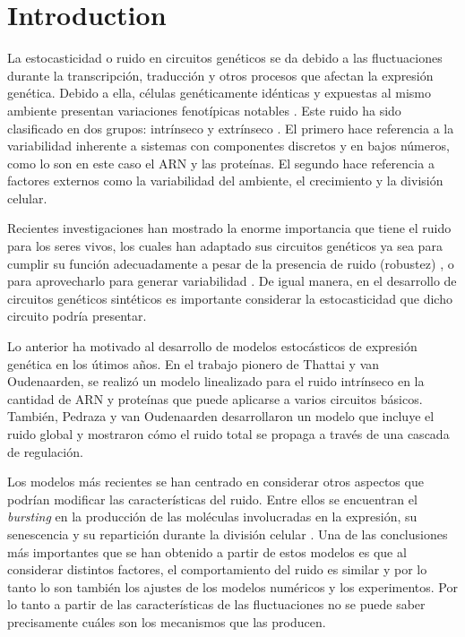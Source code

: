 \chapter*{Introduction}

La estocasticidad o ruido en circuitos gen\'eticos se da debido a las fluctuaciones durante la transcripci\'on, traducci\'on \cite{kaern05} y otros procesos que afectan la expresi\'on gen\'etica. Debido a ella, c\'elulas gen\'eticamente id\'enticas y expuestas al mismo ambiente presentan variaciones fenot\'ipicas notables \cite{kaern05} \cite{elowitz02} \cite{pedraza05}. Este ruido ha sido clasificado en dos grupos: intr\'inseco y extr\'inseco \cite{elowitz02} \cite{paulsson05}. El primero hace referencia a la variabilidad inherente a sistemas con componentes discretos y en bajos n\'umeros, como lo son en este caso el ARN y las prote\'inas. El segundo hace referencia a factores externos como la variabilidad del ambiente, el crecimiento y la divisi\'on celular.

Recientes investigaciones han mostrado la enorme importancia que tiene el ruido para los seres vivos, los cuales han adaptado sus circuitos gen\'eticos ya sea para cumplir su funci\'on adecuadamente a pesar de la presencia de ruido (robustez) \cite{alon99}, o para aprovecharlo para generar variabilidad \cite{arkin98}. De igual manera, en el desarrollo de circuitos gen\'eticos sint\'eticos es importante considerar la estocasticidad que dicho circuito podr\'ia presentar.

Lo anterior ha motivado al desarrollo de modelos estoc\'asticos de expresi\'on gen\'etica en los \'utimos a\~nos. En el trabajo pionero de Thattai y van Oudenaarden,  \cite{thattai01} se realiz\'o un modelo linealizado para el ruido intr\'inseco en la cantidad de ARN y prote\'inas que puede aplicarse a varios circuitos b\'asicos. Tambi\'en, Pedraza y van Oudenaarden \cite{pedraza05} desarrollaron un  modelo que incluye el ruido global y mostraron c\'omo el ruido total se propaga a trav\'es de una cascada de regulaci\'on.

Los modelos m\'as recientes se han centrado en considerar otros aspectos que podr\'ian modificar las caracter\'isticas del ruido. Entre ellos se encuentran el \textit{bursting} en la producci\'on de las mol\'eculas involucradas en la expresi\'on, su senescencia \cite{pedraza08} y su repartici\'on durante la divisi\'on celular \cite{huh11a} \cite{huh11b}. Una de las conclusiones m\'as importantes que se han obtenido a partir de estos modelos es que al considerar distintos factores, el comportamiento del ruido es similar y por lo tanto lo son tambi\'en los ajustes de los modelos num\'ericos y los experimentos. Por lo tanto a partir de las caracter\'isticas de las fluctuaciones no se puede saber precisamente cu\'ales son los mecanismos que las producen.


